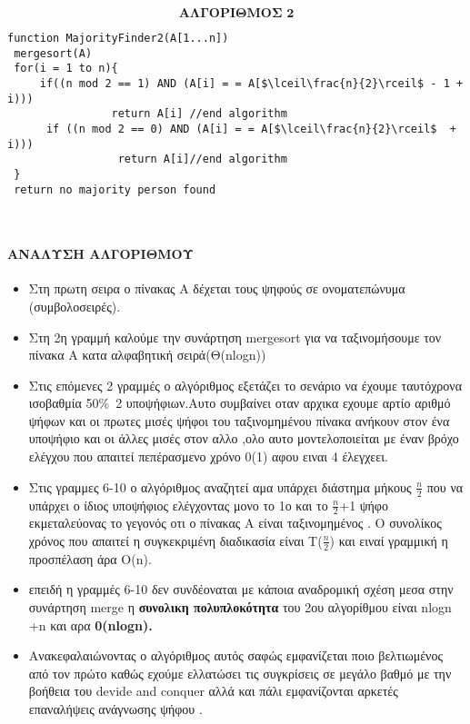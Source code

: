 \documentclass[a4paper, fleqn]{article}
\begin{document}
          $$ \textbf{ΑΛΓΟΡΙΘΜΟΣ 2}$$

\lstset{numbers=left, numbersep=5pt,frame=single,  framexleftmargin=15pt}


\begin{lstlisting}[mathescape]
function MajorityFinder2(A[1...n])
 mergesort(A)
 for(i = 1 to n){
     if((n mod 2 == 1) AND (A[i] = = A[$\lceil\frac{n}{2}\rceil$ - 1 + i)))		
                return A[i] //end algorithm
      if ((n mod 2 == 0) AND (A[i] = = A[$\lceil\frac{n}{2}\rceil$  + i)))
                 return A[i]//end algorithm
 }
 return no majority person found
 
  
\end{lstlisting}
\paragraph{    ΑΝΑΛΥΣΗ ΑΛΓΟΡΙΘΜΟΥ}
\begin{itemize}
    \item Στη πρωτη σειρα ο πίνακας Α δέχεται τους ψηφούς σε ονοματεπώνυμα (συμβολοσειρές).
\end{itemize}
\begin{itemize}
    \item Στη 2η γραμμή καλούμε την συνάρτηση  mergesort για να ταξινομήσουμε τον πίνακα Α κατα αλφαβητική σειρά(Θ(nlogn))
    \item Στις επόμενες 2 γραμμές ο αλγόριθμος εξετάζει το σενάριο να έχουμε ταυτόχρονα ισοβαθμία 50\%\ 2 υποψήφιων.Αυτο συμβαίνει οταν αρχικα εχουμε αρτίο αριθμό ψήφων και οι πρωτες μισές ψήφοι του ταξινομημένου πίνακα ανήκουν στον ένα υποψήφιο και οι άλλες μισές στον αλλο ,ολο αυτο μοντελοποιείται με έναν βρόχο ελέγχου που απαιτεί πεπέρασμενο  χρόνο 0(1) αφου ειναι 4 έλεγχεει.
    \item  Στις γραμμες 6-10 ο αλγόριθμος αναζητεί αμα υπάρχει διάστημα μήκους $\frac{n}{2}$ που να υπάρχει ο ίδιος υποψήφιος  ελέγχοντας μονο το 1ο και το $\frac{n}{2}$+1 ψήφο εκμεταλεύονας το γεγονός οτι ο πίνακας Α είναι ταξινομημένος . Ο συνολίκος χρόνος που απαιτεί η συγκεκριμένη διαδικασία είναι Τ($\frac{n}{2}$) και ειναί γραμμική η προσπέλαση άρα Ο(n).
    \item  επειδή η γραμμές 6-10 δεν συνδέοναται με κάποια αναδρομική σχέση μεσα στην συνάρτηση merge η \textbf{συνολικη πολυπλοκότητα} του 2ου αλγορίθμου είναι nlogn +n και αρα \textbf{0(nlogn).}
    \item Aνακεφαλαιώνοντας ο αλγόριθμος αυτός σαφώς εμφανίζεται ποιο βελτιωμένος από τον πρώτο καθώς εχούμε ελλατώσει τις συγκρίσεις σε μεγάλο βαθμό με την βοήθεια του devide and conquer αλλά και πάλι εμφανίζονται αρκετές επαναλήψεις ανάγνωσης ψήφου .
\end{itemize}
\end{document}
